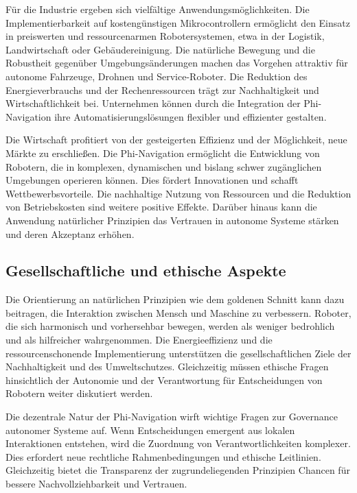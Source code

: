 ﻿\documentclass[a4paper,12pt]{article}
\theoremstyle{definition}
\begin{document}
Für die Industrie ergeben sich vielfältige Anwendungsmöglichkeiten. Die Implementierbarkeit auf kostengünstigen Mikrocontrollern ermöglicht den Einsatz in preiswerten und ressourcenarmen Robotersystemen, etwa in der Logistik, Landwirtschaft oder Gebäudereinigung. Die natürliche Bewegung und die Robustheit gegenüber Umgebungsänderungen machen das Vorgehen attraktiv für autonome Fahrzeuge, Drohnen und Service-Roboter. Die Reduktion des Energieverbrauchs und der Rechenressourcen trägt zur Nachhaltigkeit und Wirtschaftlichkeit bei. Unternehmen können durch die Integration der Phi-Navigation ihre Automatisierungslösungen flexibler und effizienter gestalten.

Die Wirtschaft profitiert von der gesteigerten Effizienz und der Möglichkeit, neue Märkte zu erschließen. Die Phi-Navigation ermöglicht die Entwicklung von Robotern, die in komplexen, dynamischen und bislang schwer zugänglichen Umgebungen operieren können. Dies fördert Innovationen und schafft Wettbewerbsvorteile. Die nachhaltige Nutzung von Ressourcen und die Reduktion von Betriebskosten sind weitere positive Effekte. Darüber hinaus kann die Anwendung natürlicher Prinzipien das Vertrauen in autonome Systeme stärken und deren Akzeptanz erhöhen.

\subsection{Gesellschaftliche und ethische Aspekte}

Die Orientierung an natürlichen Prinzipien wie dem goldenen Schnitt kann dazu beitragen, die Interaktion zwischen Mensch und Maschine zu verbessern. Roboter, die sich harmonisch und vorhersehbar bewegen, werden als weniger bedrohlich und als hilfreicher wahrgenommen. Die Energieeffizienz und die ressourcenschonende Implementierung unterstützen die gesellschaftlichen Ziele der Nachhaltigkeit und des Umweltschutzes. Gleichzeitig müssen ethische Fragen hinsichtlich der Autonomie und der Verantwortung für Entscheidungen von Robotern weiter diskutiert werden.

Die dezentrale Natur der Phi-Navigation wirft wichtige Fragen zur Governance autonomer Systeme auf. Wenn Entscheidungen emergent aus lokalen Interaktionen entstehen, wird die Zuordnung von Verantwortlichkeiten komplexer. Dies erfordert neue rechtliche Rahmenbedingungen und ethische Leitlinien. Gleichzeitig bietet die Transparenz der zugrundeliegenden Prinzipien Chancen für bessere Nachvollziehbarkeit und Vertrauen.
\end{document}
